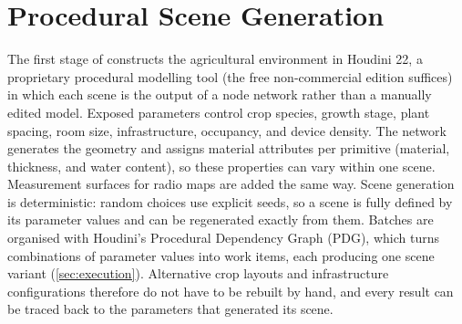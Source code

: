 \FloatBarrier\section{Procedural Scene Generation}
\label{sec:procedural}
\label{sec:simulator}


The first stage of  \housionna{}  constructs the agricultural environment in Houdini 22, a proprietary procedural modelling tool (the free non-commercial edition suffices) in which each scene is the output of a node network rather than a manually edited model. Exposed parameters control crop species, growth stage, plant spacing, room size, infrastructure, occupancy, and device density. The network generates the geometry and assigns material attributes per primitive (material, thickness, and water content), so these properties can vary within one scene. Measurement surfaces for radio maps are added the same way. Scene generation is deterministic: random choices use explicit seeds, so a scene is fully defined by its parameter values and can be regenerated exactly from them. Batches are organised with Houdini’s Procedural Dependency Graph (PDG), which turns combinations of parameter values into work items, each producing one scene variant (\cref{sec:execution}). Alternative crop layouts and infrastructure configurations therefore do not have to be rebuilt by hand, and every result can be traced back to the parameters that generated its scene.











